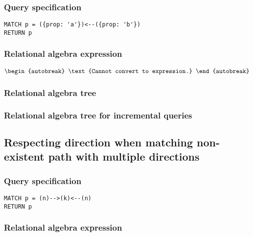 \subsubsection*{Query specification}

\begin{lstlisting}
MATCH p = ({prop: 'a'})<--({prop: 'b'})
RETURN p
\end{lstlisting}

\subsubsection*{Relational algebra expression}

\begin{align*}
\begin{autobreak}
\text{Cannot convert to expression.}
\end{autobreak}
\end{align*}

\subsubsection*{Relational algebra tree}


\subsubsection*{Relational algebra tree for incremental queries}


\subsection{Respecting direction when matching non-existent path with multiple directions}

\subsubsection*{Query specification}

\begin{lstlisting}
MATCH p = (n)-->(k)<--(n)
RETURN p
\end{lstlisting}

\subsubsection*{Relational algebra expression}

